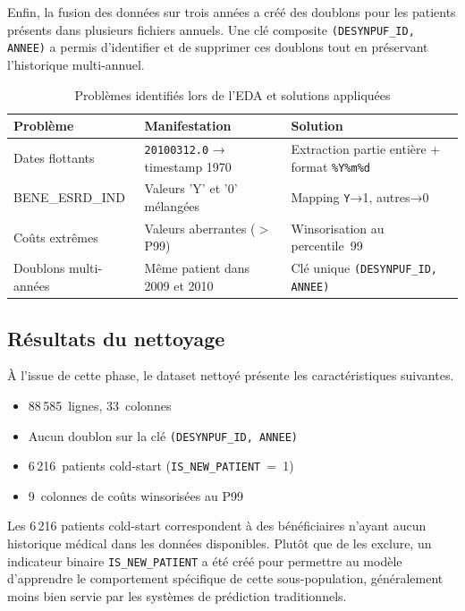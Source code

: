 Enfin, la fusion des données sur trois années a créé des doublons pour les patients présents
dans plusieurs fichiers annuels. Une clé composite \texttt{(DESYNPUF\_ID, ANNEE)} a permis
d'identifier et de supprimer ces doublons tout en préservant l'historique multi-annuel.

\begin{table}[htbp]
\centering
\caption{Problèmes identifiés lors de l'EDA et solutions appliquées}
\label{tab:bugs_eda}
\begin{tabular}{@{}p{3cm}p{4.5cm}p{5cm}@{}}
\toprule
\textbf{Problème} & \textbf{Manifestation} & \textbf{Solution} \\
\midrule
Dates flottants  & \texttt{20100312.0} → timestamp 1970
                 & Extraction partie entière + format \texttt{\%Y\%m\%d} \\
BENE\_ESRD\_IND  & Valeurs 'Y' et '0' mélangées
                 & Mapping \texttt{Y}→1, autres→0 \\
Coûts extrêmes   & Valeurs aberrantes ($>$P99)
                 & Winsorisation au percentile~99 \\
Doublons multi-années & Même patient dans 2009 et 2010
                 & Clé unique \texttt{(DESYNPUF\_ID, ANNEE)} \\
\bottomrule
\end{tabular}
\end{table}

\subsection{Résultats du nettoyage}

À l'issue de cette phase, le dataset nettoyé présente les caractéristiques suivantes.

\begin{resultatbox}
\begin{itemize}
  \item 88\,585~lignes, 33~colonnes
  \item Aucun doublon sur la clé \texttt{(DESYNPUF\_ID, ANNEE)}
  \item 6\,216~patients cold-start (\texttt{IS\_NEW\_PATIENT}~=~1)
  \item 9~colonnes de coûts winsorisées au P99
\end{itemize}
\end{resultatbox}

Les 6\,216 patients cold-start correspondent à des bénéficiaires n'ayant aucun
historique médical dans les données disponibles. Plutôt que de les exclure, un
indicateur binaire \texttt{IS\_NEW\_PATIENT} a été créé pour permettre au modèle
d'apprendre le comportement spécifique de cette sous-population, généralement
moins bien servie par les systèmes de prédiction traditionnels.


